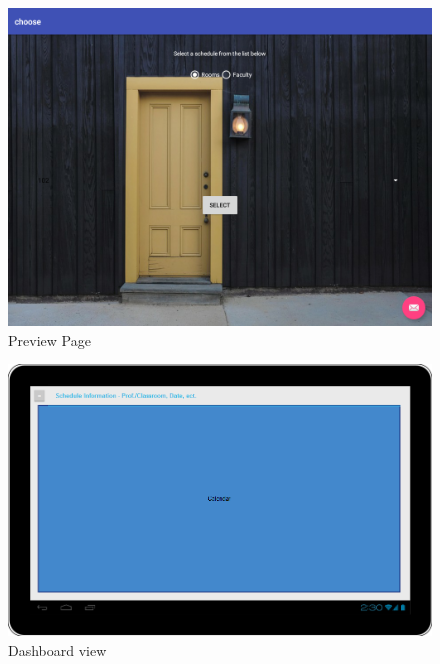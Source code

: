 \begin{figure}
\centering
  \includegraphics[scale=0.4]{selection_final.png}
  \caption{Preview Page}
  \label{fig:selection}
\end{figure}

\begin{figure}
\centering
  \includegraphics[scale=0.4]{dashboard.png}
  \caption{Dashboard view}
  \label{fig:dashboard}
\end{figure}

